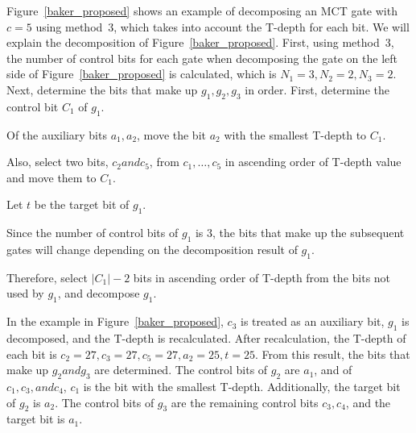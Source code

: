 \par
Figure~\ref{baker_proposed} shows an example of decomposing an MCT gate with $c=5$ using method~3, which takes into account the T-depth for each bit.
We will explain the decomposition of Figure~\ref{baker_proposed}.
First,
using method~3,
the number of control bits for each gate when decomposing the gate on the left side of Figure~\ref{baker_proposed} is calculated,
which is $N_{1}=3, N_{2}=2, N_{3}=2$.
Next, determine the bits that make up $g_{1}, g_{2}, g_{3}$ in order.
First, determine the control bit $C_{1}$ of $g_{1}$.

Of the auxiliary bits $a_{1}, a_{2}$, move the bit $a_{2}$ with the smallest T-depth to $C_{1}$.

Also, select two bits, $c_{2} and c_{5}$, from $c_{1},\dots,c_{5}$ in ascending order of T-depth value and move them to $C_{1}$.

Let $t$ be the target bit of $g_{1}$.

Since the number of control bits of $g_{1}$ is 3, the bits that make up the subsequent gates will change depending on the decomposition result of $g_{1}$.

Therefore, select $|C_{1}|-2$ bits in ascending order of T-depth from the bits not used by $g_{1}$, and decompose $g_{1}$.

In the example in Figure~\ref{baker_proposed}, $c_{3}$ is treated as an auxiliary bit, $g_{1}$ is decomposed, and the T-depth is recalculated.
After recalculation, the T-depth of each bit is $c_{2}=27, c_{3}=27, c_{5}=27, a_{2}=25, t=25$.
From this result, the bits that make up $g_{2} and g_{3}$ are determined.
The control bits of $g_{2}$ are $a_{1}$, and
of $c_{1}, c_{3}, and c_{4}$, $c_{1}$ is the bit with the smallest T-depth.
Additionally, the target bit of $g_{2}$ is $a_{2}$.
The control bits of $g_{3}$ are the remaining control bits $c_{3}, c_{4}$,
and the target bit is $a_{1}$.

